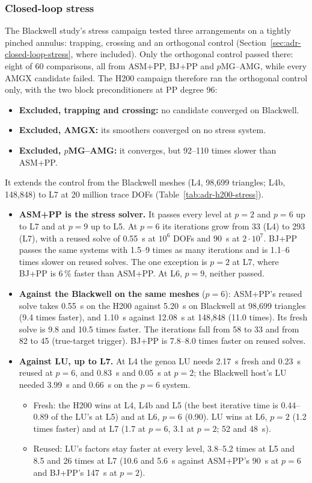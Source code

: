 \subsubsection{Closed-loop stress}
\label{sec:adr-h200-synth-stress}

The Blackwell study's stress campaign tested three arrangements on a tightly pinched annulus:
trapping, crossing and an orthogonal control (Section~\ref{sec:adr-closed-loop-stress}, where
included). Only the orthogonal control passed there: eight of 60 comparisons, all from ASM+PP,
BJ+PP and $p$MG--AMG, while every AMGX candidate failed. The H200 campaign therefore ran the
orthogonal control only, with the two block preconditioners at PP degree 96:
\begin{itemize}
\item \textbf{Excluded, trapping and crossing:} no candidate converged on Blackwell.
\item \textbf{Excluded, AMGX:} its smoothers converged on no stress system.
\item \textbf{Excluded, $p$MG--AMG:} it converges, but 92--110 times slower than ASM+PP.
\end{itemize}
It extends the control from the Blackwell meshes (L4, 98{,}699 triangles; L4b, 148{,}848) to
L7 at 20 million trace DOFs (Table~\ref{tab:adr-h200-stress}).

\begin{itemize}
\item \textbf{ASM+PP is the stress solver.} It passes every level at $p=2$ and $p=6$ up to L7
  and at $p=9$ up to L5. At $p=6$ its iterations grow from 33 (L4) to 293 (L7), with a reused
  solve of 0.55~s at $10^6$ DOFs and 90~s at $2\cdot10^7$. BJ+PP passes the same systems with
  1.5--9 times as many iterations and is 1.1--6 times slower on reused solves. The one exception
  is $p=2$ at L7, where BJ+PP is 6\,\% faster than ASM+PP. At L6, $p=9$, neither passed.
\item \textbf{Against the Blackwell on the same meshes} ($p=6$): ASM+PP's reused solve takes
  0.55~s on the H200 against 5.20~s on Blackwell at 98{,}699 triangles (9.4 times faster), and
  1.10~s against 12.08~s at 148{,}848 (11.0 times). Its fresh solve is 9.8 and 10.5 times
  faster. The iterations fall from 58 to 33 and from 82 to 45 (true-target trigger). BJ+PP is
  7.8--8.0 times faster on reused solves.
\item \textbf{Against LU, up to L7.} At L4 the genoa LU needs 2.17~s fresh and 0.23~s reused at
  $p=6$, and 0.83~s and 0.05~s at $p=2$; the Blackwell host's LU needed 3.99~s and 0.66~s on the
  $p=6$ system.
  \begin{itemize}
  \item Fresh: the H200 wins at L4, L4b and L5 (the best iterative time is 0.44--0.89 of the
    LU's at L5) and at L6, $p=6$ (0.90). LU wins at L6, $p=2$ (1.2 times faster) and at L7 (1.7
    at $p=6$, 3.1 at $p=2$; 52 and 48~s).
  \item Reused: LU's factors stay faster at every level, 3.8--5.2 times at L5 and 8.5 and 26
    times at L7 (10.6 and 5.6~s against ASM+PP's 90~s at $p=6$ and BJ+PP's 147~s at $p=2$).
  \end{itemize}
\end{itemize}

